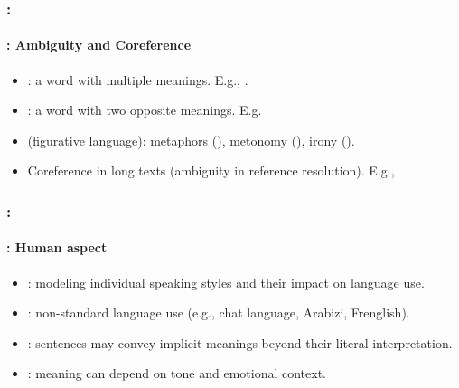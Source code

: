 \documentclass[xcolor=table]{beamer}
\begin{document}
\begin{frame}
	\frametitle{\insertshortsubtitle: \insertsection}
	\framesubtitle{\insertsubsection: Ambiguity and Coreference}

	\begin{itemize}
		\item {}: a word with multiple meanings.
		E.g., .
		
		\item {}: a word with two opposite meanings.
		E.g. 
		
		\item {} (figurative language): 
		metaphors (), 
		metonomy (), 
		irony ().
		
		\item Coreference in long texts (ambiguity in reference resolution).
		E.g., 
	\end{itemize}
	

\end{frame}

\begin{frame}
	\frametitle{\insertshortsubtitle: \insertsection}
	\framesubtitle{\insertsubsection: Human aspect}
	
	\begin{itemize}
		\item {}: modeling individual speaking styles and their impact on language use.
		
		\item {}: non-standard language use (e.g., chat language, Arabizi, Frenglish).
		
		\item {}: sentences may convey implicit meanings beyond their literal interpretation.
		
		\item {}: meaning can depend on tone and emotional context.
	\end{itemize}
	

\end{frame}
\end{document}
